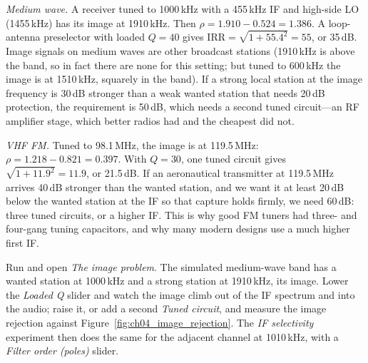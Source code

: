 
\begin{worked}
\emph{Medium wave.} A receiver tuned to 1000\,kHz with a 455\,kHz IF and high-side LO (1455\,kHz) has its image
at 1910\,kHz. Then $\rho=1.910-0.524=1.386$. A loop-antenna preselector with loaded $Q=40$ gives
$\text{IRR}=\sqrt{1+55.4^2}=55$, or 35\,dB. Image signals on medium waves are other broadcast stations
(1910\,kHz is above the band, so in fact there are none for this setting; but tuned to 600\,kHz the image is at
1510\,kHz, squarely in the band). If a strong local station at the image frequency is 30\,dB stronger than a
weak wanted station that needs 20\,dB protection, the requirement is 50\,dB, which needs a second tuned
circuit---an RF amplifier stage, which better radios had and the cheapest did not.

\emph{VHF FM.} Tuned to 98.1\,MHz, the image is at 119.5\,MHz: $\rho=1.218-0.821=0.397$. With $Q=30$, one tuned
circuit gives $\sqrt{1+11.9^2}=11.9$, or 21.5\,dB. If an aeronautical transmitter at 119.5\,MHz arrives 40\,dB
stronger than the wanted station, and we want it at least 20\,dB below the wanted station at the IF so that
capture holds firmly, we need 60\,dB: three tuned circuits, or a higher IF. This is why good FM tuners had
three- and four-gang tuning capacitors, and why many modern designs use a much higher first IF.
\end{worked}

\begin{tryit}
Run  and open \emph{The image problem}. The simulated
medium-wave band has a wanted station at 1000\,kHz and a strong station at 1910\,kHz, its image. Lower the
\emph{Loaded Q} slider and watch the image climb out of the IF spectrum and into the audio; raise it, or add a
second \emph{Tuned circuit}, and measure the image rejection against Figure~\ref{fig:ch04_image_rejection}. The
\emph{IF selectivity} experiment then does the same for the adjacent channel at 1010\,kHz, with a
\emph{Filter order (poles)} slider.
\end{tryit}

